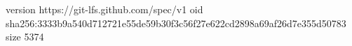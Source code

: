 version https://git-lfs.github.com/spec/v1
oid sha256:3333b9a540d712721e55de59b30f3c56f27e622cd2898a69af26d7e355d50783
size 5374
